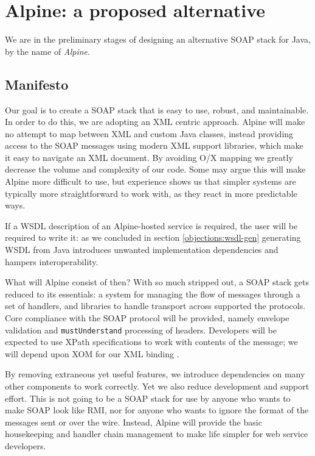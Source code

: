 \section{Alpine: a proposed alternative}
\label{alpine}

We are in the preliminary stages of designing an alternative SOAP
stack for Java, by the name of \emph{Alpine}.

\subsection{Manifesto}
\label{alpine:manifesto}

Our goal is to create a SOAP stack that is easy to use, robust, and
maintainable. In order to do this, we are adopting an XML centric
approach. Alpine will make no attempt to map between XML and custom
Java classes, instead providing access to the SOAP messages using
modern XML support libraries, which make it easy to navigate an XML
document. By avoiding O/X mapping we greatly decrease the volume and
complexity of our code. Some may argue this will make Alpine more
difficult to use, but experience shows us that simpler systems are
typically more straightforward to work with, as they react in more
predictable ways.

If a WSDL description of an Alpine-hosted service is required, the
user will be required to write it: as we concluded in section
\ref{objections:wsdl-gen} generating WSDL from Java introduces
unwanted implementation dependencies and hampers interoperability.

What will Alpine consist of then? With so much stripped out, a SOAP
stack gets reduced to its essentials: a system for managing the flow
of messages through a set of handlers, and libraries to handle
transport across supported the protocols. Core compliance with the
SOAP protocol will be provided, namely envelope validation and
\verb|mustUnderstand| processing of headers. Developers will be
expected to use XPath specifications to work with contents of the
message; we will depend upon XOM for our XML binding
\cite{harold:xom}.

By removing extraneous yet useful features, we introduce dependencies
on many other components to work correctly. Yet we also reduce
development and support effort. This is not going to be a SOAP stack
for use by anyone who wants to make SOAP look like RMI, nor for anyone
who wants to ignore the format of the messages sent or over the wire.
Instead, Alpine will provide the basic housekeeping and handler
chain management to make life simpler for web service developers.

